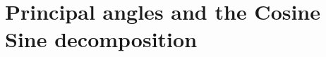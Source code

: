 \documentclass[twoside,11pt]{book}
\numberwithin{theorem}{chapter}
\numberwithin{definition}{chapter}
\numberwithin{proposition}{chapter}
\numberwithin{corollary}{chapter}
\numberwithin{example}{chapter}
\numberwithin{lemma}{chapter}
\numberwithin{assumption}{chapter}
\begin{document}






\section{Principal angles and the Cosine Sine decomposition}
\label{app:principal_angles}


\end{document}

